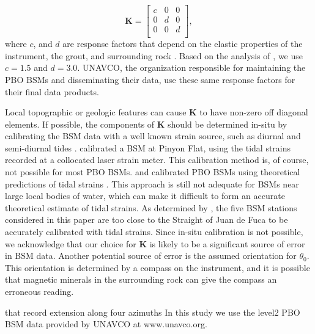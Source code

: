 \documentclass[10pt,a4paper]{article}
\begin{document}
\begin{equation}\label{eq:CouplingMatrix}
\mathbf{K} = 
\left[\begin{array}{ccc}
c & 0 & 0 \\
0 & d & 0 \\
0 & 0 & d \\
\end{array}\right],
\end{equation}  
where $c$, and $d$ are response factors that depend on the elastic properties of the instrument, the grout, and surrounding rock \citep{Gladwin1985}. Based on the analysis of \citet{Gladwin1985}, we use $c=1.5$ and $d=3.0$. UNAVCO, the organization responsible for maintaining the PBO BSMs and disseminating their data, use these same response factors for their final data products. 

Local topographic or geologic features can cause $\mathbf{K}$ to have non-zero off diagonal elements. If possible, the components of $\mathbf{K}$ should be determined in-situ by calibrating the BSM data with a well known strain source, such as diurnal and semi-diurnal tides \citep{Hart1996,Roeloffs2010,Hodgkinson2013}. \citet{Hart1996} calibrated a BSM at Pinyon Flat, using the tidal strains recorded at a collocated laser strain meter. This calibration method is, of course, not possible for most PBO BSMs. \citet{Roeloffs2010} and \citet{Hodgkinson2013} calibrated PBO BSMs using theoretical predictions of tidal strains \citep[e.g.,][]{Agnew1997}. This approach is still not adequate for BSMs near large local bodies of water, which can make it difficult to form an accurate theoretical estimate of tidal strains. As determined by \citet{Roeloffs2010}, the five BSM stations considered in this paper are too close to the Straight of Juan de Fuca to be accurately calibrated with tidal strains. Since in-situ calibration is not possible, we acknowledge that our choice for $\mathbf{K}$ is likely to be a significant source of error in BSM data. Another potential source of error is the assumed orientation for $\theta_0$. This orientation is determined by a compass on the instrument, and it is possible that magnetic minerals in the surrounding rock can give the compass an erroneous reading. 

that record extension along four azimuths  
In this study we use the level2 PBO BSM data provided by UNAVCO at www.unavco.org.     
\end{document}
